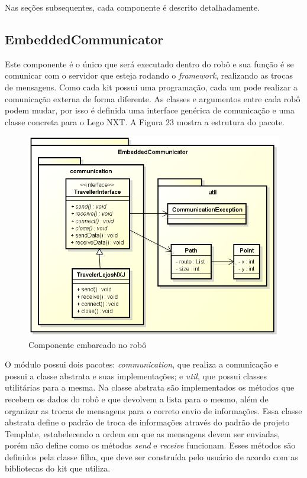 Nas seções subsequentes, cada componente é descrito detalhadamente.

\subsection{EmbeddedCommunicator}

Este componente é o único que será executado dentro do robô e sua função é se comunicar com o servidor que esteja rodando o \textit{framework}, realizando as trocas de mensagens. Como cada kit possui uma programação, cada um pode realizar a comunicação externa de forma diferente. As classes e argumentos entre cada robô podem mudar, por isso é definida uma interface genérica de comunicação e uma classe concreta para o Lego NXT. A Figura 23 mostra a estrutura do pacote.

\begin{figure}[h]
	\centering
	\label{fig23}
		\includegraphics[keepaspectratio=true,scale=0.5]{figuras/embedded.png}
	\caption{Componente embarcado no robô}
\end{figure}

O módulo possui dois pacotes: \textit{communication}, que realiza a comunicação e possui a classe abstrata e suas implementações; e \textit{util}, que possui classes utilitárias para a mesma. Na classe abstrata são implementados os métodos que recebem os dados do robô e que devolvem a lista para o mesmo, além de organizar as trocas de mensagens para o correto envio de informações. Essa classe abstrata define o padrão de troca de informações através do padrão de projeto Template, estabelecendo a ordem em que as mensagens devem ser enviadas, porém não define como os métodos \textit{send} e \textit{receive} funcionam. Esses métodos são definidos pela classe filha, que deve ser construída pelo usuário de acordo com as bibliotecas do kit que utiliza.

